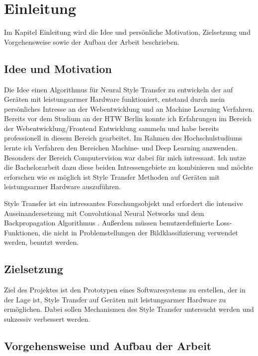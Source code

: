 \chapter{Einleitung}

Im Kapitel Einleitung wird die Idee und persönliche Motivation, Zielsetzung und Vorgehensweise sowie der Aufbau der Arbeit beschrieben.

\section{Idee und Motivation}

Die Idee einen Algorithmus für Neural Style Transfer zu entwickeln der auf Geräten mit leistungsarmer Hardware funktioniert, entstand durch mein persönliches 
Intresse an der Webentwicklung und an Machine Learning Verfahren. Bereits vor dem Studium an der HTW Berlin konnte ich Erfahrungen im Bereich der Webentwicklung/Frontend Entwicklung sammeln und habe bereits professionell in diesem Bereich gearbeitet. Im Rahmen des Hochschulstudiums lernte ich
Verfahren den Bereichen Machine- und Deep Learning anzwenden. Besonders der Bereich Computervision war dabei für mich intressant. Ich nutze die Bachelorarbeit dazu diese beiden Intressengebiete zu kombinieren und möchte erforschen wie es möglich ist Style Transfer Methoden auf Geräten mit leistungsarmer Hardware auszuführen.

Style Transfer ist ein intressantes Forschungsobjekt und erfordert die intensive Auseinandersetzung mit Convolutional Neural Networks \cite{lecun-gradientbased-learning-applied-1998} und dem Backpropagation Algorithmus \cite{doi:10.1162/neco.1989.1.4.541}. Außerdem müssen benutzerdefinierte Loss-Funktionen, die nicht in Problemstellungen der Bildklassifizierung verwendet werden, benutzt werden.

\section{Zielsetzung}

Ziel des Projektes ist den Prototypen eines Softwaresystems zu erstellen, der in der Lage ist, Style Transfer auf Geräten mit leistungsarmer Hardware zu ermöglichen. Dabei sollen Mechanismen des Style Transfer untersucht werden und sukzessiv verbessert werden.

\section{Vorgehensweise und Aufbau der Arbeit}

